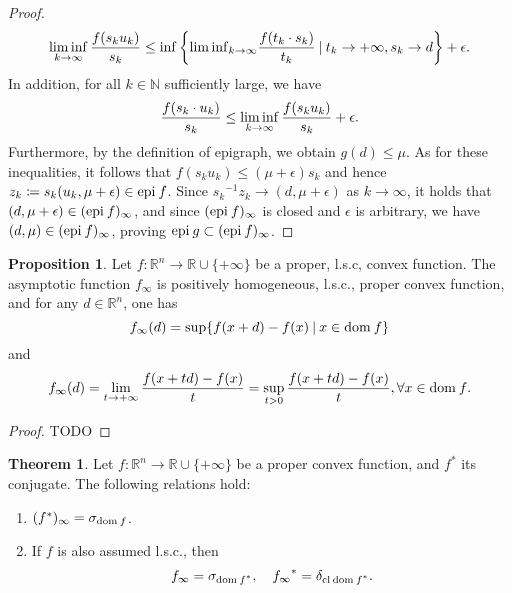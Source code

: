 \documentclass[a4paper,11pt, oneside]{book}
\theoremstyle{definition}
\newtheorem{prop}[dfn]{Proposition}
\newtheorem{thm}[dfn]{Theorem}
\newcommand{\NaturalNumberSet}{\mathbb{N}}
\newcommand{\RealNumberSet}{\mathbb{R}}
\newcommand{\NDemenstionalRealEuclideanSpace}{\mathbb{R}^n}
\newcommand{\Closure}[1]{\text{\rm cl\:${#1}$}} %
\newcommand{\Domain}[1]{\text{\rm dom\:${#1}$}} %
\newcommand{\Epigraph}[1]{\text{\rm epi\:${#1}$}} %
\newcommand{\ExtendedRealValuedFunction}[2]{{#1}: {#2} \to \RealNumberSet \cup \{+\infty\}}
\newcommand{\ConjugateFunction}[1]{{#1}^*}
\newcommand{\SupportFunction}[1]{\sigma_{#1}}
\newcommand{\IndicatorFunction}[1]{\delta_{#1}}
\begin{document}
\begin{proof}
  \begin{equation}
    \liminf_{k \to \infty} \frac{f(s_k u_k)}{s_k} \leq \inf \left\{ {\liminf}_{k \to \infty} \frac{f(t_k \cdot s_k)}{t_k} \:|\: t_k \to +\infty, s_k \to d \right\} + \epsilon. \notag
  \end{equation}
  In addition, for all $k \in \NaturalNumberSet$ sufficiently large, we have
  \begin{equation}
    \frac{f(s_k \cdot u_k)}{s_k} \leq \liminf_{k \to \infty} \frac{f(s_k u_k)}{s_k} + \epsilon. \notag
  \end{equation}
  Furthermore, by the definition of epigraph, we obtain $g(d) \leq \mu$. As for these inequalities, it follows that $f(s_k u_k) \leq (\mu + \epsilon) s_k$ and hence $z_k \coloneqq s_k (u_k,\mu + \epsilon) \in \Epigraph{f}$. Since ${s_k}^{-1}z_k \to (d, \mu + \epsilon)$ as $k \to \infty$, it holds that $(d, \mu + \epsilon) \in (\Epigraph{f})_{\infty}$, and since $(\Epigraph{f})_{\infty}$ is closed and $\epsilon$ is arbitrary, we have $(d, \mu) \in (\Epigraph{f})_{\infty}$, proving $\Epigraph{g} \subset (\Epigraph{f})_{\infty}$.
\end{proof}

\begin{prop}
  Let $\ExtendedRealValuedFunction{f}{\NDemenstionalRealEuclideanSpace}$ be a proper, l.s.c, convex function. The asymptotic function $f_{\infty}$ is positively homogeneous, l.s.c., proper convex function, and for any $d \in \NDemenstionalRealEuclideanSpace$, one has
  \begin{equation}
    f_{\infty}(d) = \sup \{f(x+d) -f(x) \:|\: x \in \Domain{f}\}
  \end{equation}
  and
  \begin{equation}
    f_{\infty}(d) = \lim_{t \to +\infty} \frac{f(x+td) -f(x)}{t} = \sup_{t>0} \frac{f(x+td) - f(x)}{t}, \forall x \in \Domain{f}.
  \end{equation}
\end{prop}

\begin{proof}
  TODO
\end{proof}

\begin{thm}
  Let $\ExtendedRealValuedFunction{f}{\NDemenstionalRealEuclideanSpace}$ be a proper convex function, and $\ConjugateFunction{f}$ its conjugate. The following relations hold:
  \begin{enumerate}[label=\alph*,align=CenterWithParen]
    \item $(\ConjugateFunction{f})_{\infty} = \SupportFunction{\Domain{f}}$.
    \item If $f$ is also assumed l.s.c., then
    \begin{equation}
      f_{\infty} = \SupportFunction{\Domain{\ConjugateFunction{f}}},\quad \ConjugateFunction{f_{\infty}} = \IndicatorFunction{\Closure{\Domain{\ConjugateFunction{f}}}}. \notag
    \end{equation}
  \end{enumerate}
\end{thm}
\end{document}
